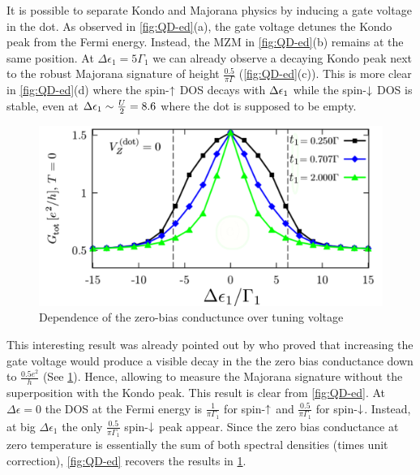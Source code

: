  It is possible to separate Kondo and Majorana physics by inducing a gate voltage in the dot. As observed in \ref{fig:QD-ed}(a), the gate voltage detunes the Kondo peak from the Fermi energy. Instead, the MZM in \ref{fig:QD-ed}(b) remains at the same position. At $\Delta \epsilon_1 = 5\Gamma_1$ we can already observe a decaying Kondo peak next to the robust Majorana signature of height $\frac{0.5}{\pi\Gamma}$ (\ref{fig:QD-ed}(c)). This is more clear in \ref{fig:QD-ed}(d) where the spin-$\uparrow$ DOS decays with $\Delta \epsilon_1$ while the spin-$\downarrow$ DOS is stable, even at $\Delta \epsilon_1 \sim \frac{U}{2} = 8.6$ where the dot is supposed to be empty. 

 \begin{figure}[h]
 \centering
 \includegraphics[scale=0.5]{IMAGES/Majorana/Luis.png}
 \caption{\label{fig:Luis}Dependence of the zero-bias conductunce over tuning voltage \protect{}}
 \end{figure}



 This interesting result was already pointed out by  \citeauthor{ruiz-tijerina_interaction_2015}  
 who proved that increasing the gate voltage would produce a visible decay in the the zero bias conductance down to $\frac{0.5 e^2}{h}$ (See \ref{fig:Luis}). Hence, allowing to measure the Majorana signature without the superposition with the Kondo peak.  This result is clear from \ref{fig:QD-ed}. At $\Delta \epsilon = 0$ the DOS at the Fermi energy is $\frac{1}{\pi \Gamma_1}$ for spin-$\uparrow$ and $\frac{0.5}{\pi \Gamma_1}$ for spin-$\downarrow$. Instead, at big $\Delta \epsilon_1$ the only $\frac{0.5}{\pi \Gamma_1}$ spin-$\downarrow$ peak appear.  Since the zero bias conductance at zero temperature is essentially the sum of both spectral densities (times unit correction), \ref{fig:QD-ed} recovers the results in \ref{fig:Luis}. 

